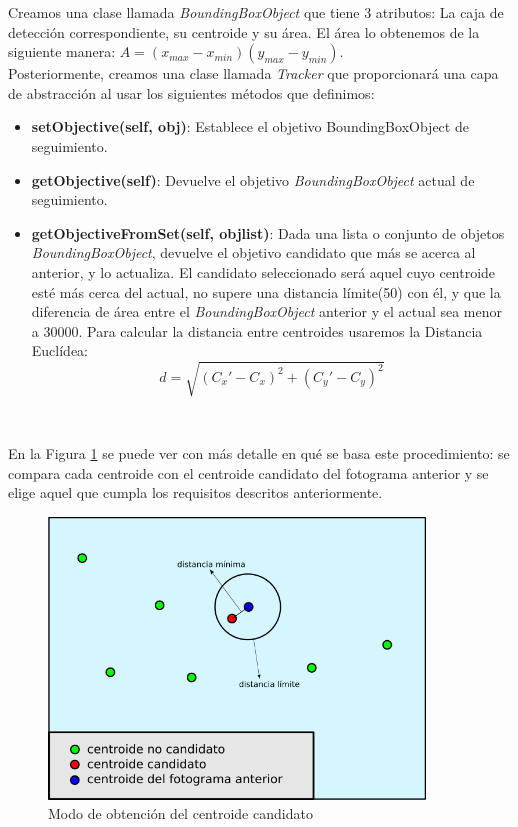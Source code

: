 Creamos una clase llamada \textit{BoundingBoxObject} que tiene 3 atributos: La caja de detección correspondiente, su centroide y su área. El área lo obtenemos de la siguiente manera: $A = (x_{max} - x_{min}) (y_{max} - y_{min})$.\\

Posteriormente, creamos una clase llamada \textit{Tracker} que proporcionará una capa de abstracción al usar los siguientes métodos que definimos:

\begin{itemize}
	\item \textbf{setObjective(self, obj)}: Establece el objetivo BoundingBoxObject de seguimiento.
	\item \textbf{getObjective(self)}: Devuelve el objetivo \textit{BoundingBoxObject} actual de seguimiento.
	\item \textbf{getObjectiveFromSet(self, objlist)}: Dada una lista o conjunto de objetos \textit{BoundingBoxObject}, devuelve el objetivo candidato que más se acerca al anterior, y lo actualiza. El candidato seleccionado será aquel cuyo centroide esté más cerca del actual, no supere una distancia límite(50) con él, y que la diferencia de área entre el \textit{BoundingBoxObject} anterior y el actual sea menor a 30000. Para calcular la distancia entre centroides usaremos la Distancia Euclídea:
	\begin{equation*}
	d = \sqrt{(C_{x}' - C_{x})^2 + (C_{y}' - C_{y})^2}
	\end{equation*}
\end{itemize}\

En la Figura \ref{fig:obtencion_centroide} se puede ver con más detalle en qué se basa este procedimiento: se compara cada centroide con el centroide candidato del fotograma anterior y se elige aquel que cumpla los requisitos descritos anteriormente.\\

\begin{figure} [H]
  \begin{center}
    \includegraphics[width=10cm]{imagenes/cap6/esquema-tracker.png}
  \end{center}
  \caption[Modo de obtención del centroide candidato]{Modo de obtención del centroide candidato}
  \label{fig:obtencion_centroide}
\end{figure}\

